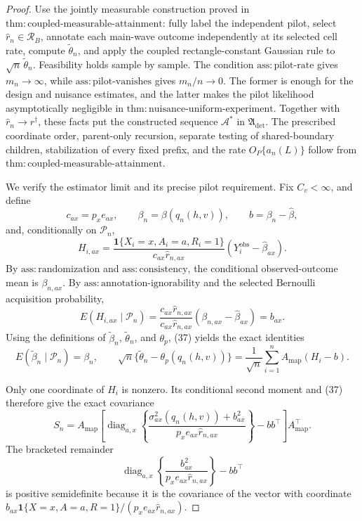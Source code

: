\documentclass{article}
\begin{document}
\begin{proof}
Use the jointly measurable construction proved in \(\mathrm{thm:coupled\text{-}measurable\text{-}attainment}\): fully label the independent pilot, select \(\widehat r_n\in\mathcal R_B\), annotate each main-wave outcome independently at its selected cell rate, compute \(\widetilde\theta_n\), and apply the coupled rectangle-constant Gaussian rule to \(\sqrt n\,\widetilde\theta_n\). Feasibility holds sample by sample. The condition \(\mathrm{ass:pilot\text{-}rate}\) gives \(m_n\to\infty\), while \(\mathrm{ass:pilot\text{-}vanishes}\) gives \(m_n/n\to0\). The former is enough for the design and nuisance estimates, and the latter makes the pilot likelihood asymptotically negligible in \(\mathrm{thm:nuisance\text{-}uniform\text{-}experiment}\). Together with \(\widehat r_n\to r^\dagger\), these facts put the constructed sequence \(\mathcal A^*\) in \(\mathfrak A_{\mathrm{det}}\). The prescribed coordinate order, parent-only recursion, separate testing of shared-boundary children, stabilization of every fixed prefix, and the rate \(O_P\{a_n(L)\}\) follow from \(\mathrm{thm:coupled\text{-}measurable\text{-}attainment}\).

We verify the estimator limit and its precise pilot requirement. Fix \(C_v<\infty\), and define
\[
c_{ax}=p_xe_{ax},\qquad
\beta_n=\beta(q_n(h,v)),\qquad
b=\beta_n-\widehat\beta,
\]
and, conditionally on \(\mathscr P_n\),
\[
H_{i,ax}=\frac{\mathbf1\{X_i=x,A_i=a,R_i=1\}}
{c_{ax}\widehat r_{n,ax}}
(Y_i^{\mathrm{obs}}-\widehat\beta_{ax}).
\tag{36}
\]
By \(\mathrm{ass:randomization}\) and \(\mathrm{ass:consistency}\), the conditional observed-outcome mean is \(\beta_{n,ax}\). By \(\mathrm{ass:annotation\text{-}ignorability}\) and the selected Bernoulli acquisition probability,
\[
E(H_{i,ax}\mid\mathscr P_n)
=\frac{c_{ax}\widehat r_{n,ax}}
{c_{ax}\widehat r_{n,ax}}
(\beta_{n,ax}-\widehat\beta_{ax})=b_{ax}.
\tag{37}
\]
Using the definitions of \(\widetilde\beta_n\), \(\widetilde\theta_n\), and \(\theta_p\), (37) yields the exact identities
\[
E(\widetilde\beta_n\mid\mathscr P_n)=\beta_n,
\qquad
\sqrt n\{\widetilde\theta_n-\theta_p(q_n(h,v))\}
=\frac1{\sqrt n}\sum_{i=1}^nA_{\mathrm{map}}(H_i-b).
\tag{38}
\]

Only one coordinate of \(H_i\) is nonzero. Its conditional second moment and (37) therefore give the exact covariance
\[
S_n=A_{\mathrm{map}}\left[
\operatorname{diag}_{a,x}\left\{
\frac{\sigma^2_{ax}(q_n(h,v))+b_{ax}^2}
{p_xe_{ax}\widehat r_{n,ax}}
\right\}-bb^\top\right]A_{\mathrm{map}}^\top.
\tag{39}
\]
The bracketed remainder
\[
\operatorname{diag}_{a,x}\left\{
\frac{b_{ax}^2}{p_xe_{ax}\widehat r_{n,ax}}
\right\}-bb^\top
\tag{40}
\]
is positive semidefinite because it is the covariance of the vector with coordinate \(b_{ax}\mathbf1\{X=x,A=a,R=1\}/(p_xe_{ax}\widehat r_{n,ax})\).


\end{proof}
\end{document}
